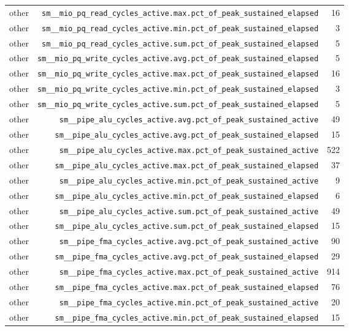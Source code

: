 \begin{table}[h]
\begin{tabular}{|l|r|r|}
other & \texttt{sm__mio_pq_read_cycles_active.max.pct_of_peak_sustained_elapsed} & 16 \\
other & \texttt{sm__mio_pq_read_cycles_active.min.pct_of_peak_sustained_elapsed} & 3 \\
other & \texttt{sm__mio_pq_read_cycles_active.sum.pct_of_peak_sustained_elapsed} & 5 \\
other & \texttt{sm__mio_pq_write_cycles_active.avg.pct_of_peak_sustained_elapsed} & 5 \\
other & \texttt{sm__mio_pq_write_cycles_active.max.pct_of_peak_sustained_elapsed} & 16 \\
other & \texttt{sm__mio_pq_write_cycles_active.min.pct_of_peak_sustained_elapsed} & 3 \\
other & \texttt{sm__mio_pq_write_cycles_active.sum.pct_of_peak_sustained_elapsed} & 5 \\
other & \texttt{sm__pipe_alu_cycles_active.avg.pct_of_peak_sustained_active} & 49 \\
other & \texttt{sm__pipe_alu_cycles_active.avg.pct_of_peak_sustained_elapsed} & 15 \\
other & \texttt{sm__pipe_alu_cycles_active.max.pct_of_peak_sustained_active} & 522 \\
other & \texttt{sm__pipe_alu_cycles_active.max.pct_of_peak_sustained_elapsed} & 37 \\
other & \texttt{sm__pipe_alu_cycles_active.min.pct_of_peak_sustained_active} & 9 \\
other & \texttt{sm__pipe_alu_cycles_active.min.pct_of_peak_sustained_elapsed} & 6 \\
other & \texttt{sm__pipe_alu_cycles_active.sum.pct_of_peak_sustained_active} & 49 \\
other & \texttt{sm__pipe_alu_cycles_active.sum.pct_of_peak_sustained_elapsed} & 15 \\
other & \texttt{sm__pipe_fma_cycles_active.avg.pct_of_peak_sustained_active} & 90 \\
other & \texttt{sm__pipe_fma_cycles_active.avg.pct_of_peak_sustained_elapsed} & 29 \\
other & \texttt{sm__pipe_fma_cycles_active.max.pct_of_peak_sustained_active} & 914 \\
other & \texttt{sm__pipe_fma_cycles_active.max.pct_of_peak_sustained_elapsed} & 76 \\
other & \texttt{sm__pipe_fma_cycles_active.min.pct_of_peak_sustained_active} & 20 \\
other & \texttt{sm__pipe_fma_cycles_active.min.pct_of_peak_sustained_elapsed} & 15 \\

\end{tabular}
\end{table}
